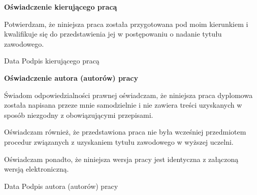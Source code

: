 \documentclass[a4paper,twoside,openright,11pt]{report}
\begin{document}
  \begin{titlepage}
    \large
    \null
    \vfill
    
   \textbf{\Large Oświadczenie kierującego pracą }
      \vspace{10mm}
      
   Potwierdzam, że niniejsza praca została przygotowana pod moim 
   kierunkiem i kwalifikuje się do przedstawienia jej w postępowaniu 
   o nadanie tytułu zawodowego. 
   \vspace{15mm}
   
   Data \hfill Podpis kierującego pracą 
   
   \vspace{3cm}
   \textbf{\Large Oświadczenie autora (autorów) pracy}
    \vspace{10mm}
    
   Świadom odpowiedzialności prawnej oświadczam, że niniejsza praca dyplomowa została 
   napisana przeze mnie samodzielnie i nie zawiera treści uzyskanych w sposób niezgodny 
   z obowiązującymi przepisami. 
   
   Oświadczam również, że przedstawiona praca nie była 
   wcześniej przedmiotem procedur związanych z uzyskaniem tytułu zawodowego w wyższej uczelni. 
   
   Oświadczam ponadto, że niniejsza wersja pracy jest identyczna z załączoną wersją elektroniczną. 
   \vspace{15mm}
   
   Data \hfill Podpis autora (autorów) pracy
    \vspace{4cm}
  \end{titlepage}
\end{document}
